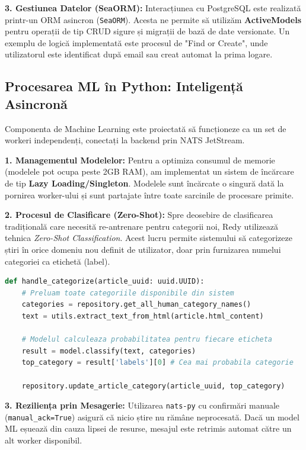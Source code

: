 \documentclass[12pt,a4paper]{article}
\begin{document}
\textbf{3. Gestiunea Datelor (SeaORM):}
Interacțiunea cu PostgreSQL este realizată printr-un ORM asincron (\texttt{SeaORM}). Acesta ne permite să utilizăm \textbf{ActiveModels} pentru operații de tip CRUD sigure și migrații de bază de date versionate. Un exemplu de logică implementată este procesul de "Find or Create", unde utilizatorul este identificat după email sau creat automat la prima logare.

\newpage

\subsection{Procesarea ML în Python: Inteligență Asincronă}

Componenta de Machine Learning este proiectată să funcționeze ca un set de workeri independenți, conectați la backend prin NATS JetStream.

\textbf{1. Managementul Modelelor:}
Pentru a optimiza consumul de memorie (modelele pot ocupa peste 2GB RAM), am implementat un sistem de încărcare de tip \textbf{Lazy Loading/Singleton}. Modelele sunt încărcate o singură dată la pornirea worker-ului și sunt partajate între toate sarcinile de procesare primite.

\textbf{2. Procesul de Clasificare (Zero-Shot):}
Spre deosebire de clasificarea tradițională care necesită re-antrenare pentru categorii noi, Redy utilizează tehnica \textit{Zero-Shot Classification}. Acest lucru permite sistemului să categorizeze știri în orice domeniu nou definit de utilizator, doar prin furnizarea numelui categoriei ca etichetă (label).

\begin{lstlisting}[language=Python, caption=Logica de clasificare dinamica]
def handle_categorize(article_uuid: uuid.UUID):
    # Preluam toate categoriile disponibile din sistem
    categories = repository.get_all_human_category_names()
    text = utils.extract_text_from_html(article.html_content)
    
    # Modelul calculeaza probabilitatea pentru fiecare eticheta
    result = model.classify(text, categories)
    top_category = result['labels'][0] # Cea mai probabila categorie
    
    repository.update_article_category(article_uuid, top_category)
\end{lstlisting}

\textbf{3. Reziliența prin Mesagerie:}
Utilizarea \texttt{nats-py} cu confirmări manuale (\texttt{manual\_ack=True}) asigură că nicio știre nu rămâne neprocesată. Dacă un model ML eșuează din cauza lipsei de resurse, mesajul este retrimis automat către un alt worker disponibil.
\end{document}
